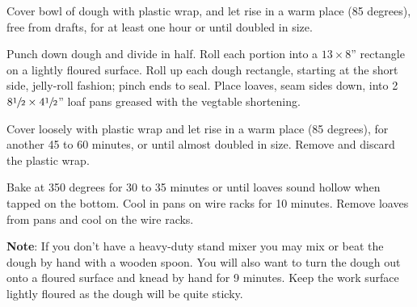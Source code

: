 \documentclass{article}
\begin{document}
Cover bowl of dough with plastic wrap, and let rise in a warm place (85 degrees), free from
drafts, for at least one hour or until doubled in size.

Punch down dough and divide in half. Roll each portion into a $13\times8$'' rectangle on a
lightly floured surface. Roll up each dough rectangle, starting at the short side,
jelly-roll fashion; pinch ends to seal. Place loaves, seam sides down, into 2
$8\sfrac{1}{2}\times4\sfrac{1}{2}$'' loaf pans greased with the vegtable shortening.

Cover loosely with plastic wrap and let rise in a warm place (85 degrees), for another
45 to 60 minutes, or until almost doubled in size. Remove and discard the plastic wrap.

Bake at 350 degrees for 30 to 35 minutes or until loaves sound hollow when tapped on the bottom.
Cool in pans on wire racks for 10 minutes. Remove loaves from pans and cool on the wire racks.


\textbf{Note}: If you don't have a heavy-duty stand mixer you may mix or beat the dough by
hand with a wooden spoon. You will also want to turn the dough out onto a floured
surface and knead by hand for 9 minutes. Keep the work surface lightly floured as
the dough will be quite sticky.

\end{document}
